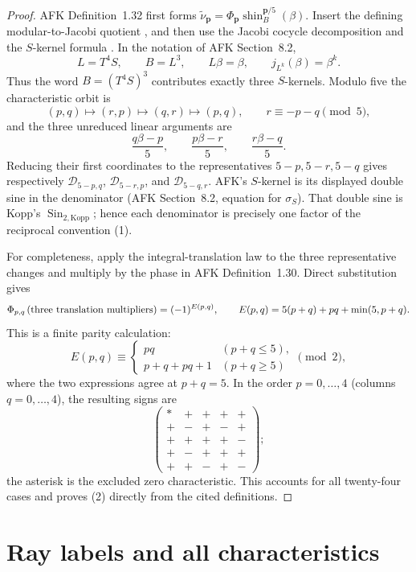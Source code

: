 \documentclass[11pt]{article}
\begin{document}
\begin{proof}
AFK Definition~1.32 first forms
$\widetilde\nu_{\boldsymbol p}
=\Phi_{\boldsymbol p}\operatorname{shin}^{\boldsymbol p/5}_{B}(\beta)$.
Insert the defining modular-to-Jacobi quotient
\cite[equation (1.26)]{AFK}, and then use the Jacobi cocycle
decomposition \cite[equations (8.2)--(8.5)]{AFK} and the $S$-kernel
formula \cite[equation (8.6)]{AFK}.  In the notation of AFK Section~8.2,
\[
 L=T^4S,\qquad B=L^3,\qquad L\beta=\beta,\qquad
 j_{L^k}(\beta)=\beta^k .
\]
Thus the word $B=(T^4S)^3$ contributes exactly three $S$-kernels.
Modulo five the characteristic orbit is
\[
 (p,q)\longmapsto(r,p)\longmapsto(q,r)\longmapsto(p,q),
 \qquad r\equiv-p-q\pmod5,
\]
and the three unreduced linear arguments are
\[
 \frac{q\beta-p}{5},\qquad
 \frac{p\beta-r}{5},\qquad
 \frac{r\beta-q}{5}.
\]
Reducing their first coordinates to the representatives
$5-p,5-r,5-q$ gives respectively
$\mathcal D_{5-p,q}$, $\mathcal D_{5-r,p}$, and
$\mathcal D_{5-q,r}$.  AFK's $S$-kernel is its displayed double sine
in the denominator (AFK Section~8.2, equation for
$\sigma_S$).  That double sine is Kopp's
$\operatorname{Sin}_{2,\mathrm{Kopp}}$; hence each denominator is
precisely one factor of the reciprocal convention (1).

For completeness, apply the integral-translation law
\cite[equation (8.9)]{AFK} to the three representative changes and
multiply by the phase in AFK Definition~1.30.  Direct substitution gives
\[
 \Phi_{p,q}\,(\hbox{three translation multipliers})
 =(-1)^{E(p,q)},\qquad
 E(p,q)=5(p+q)+pq+\min(5,p+q).
\]
This is a finite parity calculation:
\[
 E(p,q)\equiv
 \begin{cases}
 pq& (p+q\le5),\\
 p+q+pq+1&(p+q\ge5)
 \end{cases}\pmod2,
\]
where the two expressions agree at $p+q=5$.  In the order
$p=0,\ldots,4$ (columns $q=0,\ldots,4$), the resulting signs are
\[
\begin{pmatrix}
 *&+&+&+&+\\
 +&-&+&-&+\\
 +&+&+&+&-\\
 +&-&+&+&+\\
 +&+&-&+&-
\end{pmatrix};
\]
the asterisk is the excluded zero characteristic.  This accounts for
all twenty-four cases and proves (2) directly from the cited
definitions.
\end{proof}

\section{Ray labels and all characteristics}
\end{document}
